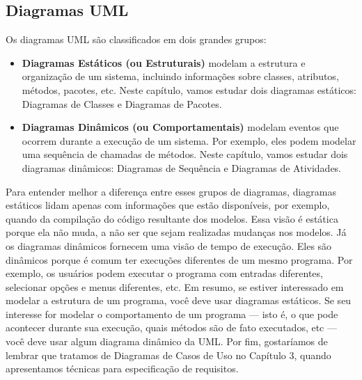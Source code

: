\documentclass[
  11pt,
  twoside]{book}
\begin{document}
\hypertarget{diagramas-uml}{%
\subsection*{Diagramas UML}\label{diagramas-uml}}

 

Os diagramas UML são classificados em dois grandes grupos:

\begin{itemize}
\item
  \textbf{Diagramas Estáticos (ou Estruturais)} modelam a estrutura e
  organização de um sistema, incluindo informações sobre classes,
  atributos, métodos, pacotes, etc. Neste capítulo, vamos estudar dois
  diagramas estáticos: Diagramas de Classes e Diagramas de Pacotes.
\item
  \textbf{Diagramas Dinâmicos (ou Comportamentais)} modelam eventos que
  ocorrem durante a execução de um sistema. Por exemplo, eles podem
  modelar uma sequência de chamadas de métodos. Neste capítulo, vamos
  estudar dois diagramas dinâmicos: Diagramas de Sequência e Diagramas
  de Atividades.
\end{itemize}

Para entender melhor a diferença entre esses grupos de diagramas,
diagramas estáticos lidam apenas com informações que estão disponíveis,
por exemplo, quando da compilação do código resultante dos modelos. Essa
visão é estática porque ela não muda, a não ser que sejam realizadas
mudanças nos modelos. Já os diagramas dinâmicos fornecem uma visão de
tempo de execução. Eles são dinâmicos porque é comum ter execuções
diferentes de um mesmo programa. Por exemplo, os usuários podem executar
o programa com entradas diferentes, selecionar opções e menus
diferentes, etc. Em resumo, se estiver interessado em modelar a
estrutura de um programa, você deve usar diagramas estáticos. Se seu
interesse for modelar o comportamento de um programa --- isto é, o que
pode acontecer durante sua execução, quais métodos são de fato
executados, etc --- você deve usar algum diagrama dinâmico da UML. Por
fim, gostaríamos de lembrar que tratamos de Diagramas de Casos de Uso no
Capítulo 3, quando apresentamos técnicas para especificação de
requisitos.
\end{document}
